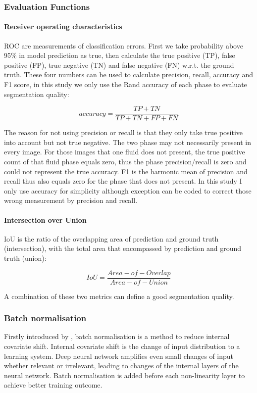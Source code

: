 \subsubsection{Evaluation Functions}
\paragraph{Receiver operating characteristics }
ROC \citep{delong1988comparing} are measurements of classification errors. First we take probability above 95\% in model prediction as true, then calculate the true positive (TP), false positive (FP), true negative (TN) and false negative (FN) w.r.t. the ground truth. These four numbers can be used to calculate precision, recall, accuracy and F1 score, in this study we only use the Rand accuracy of each phase to evaluate segmentation quality:

\begin{equation}
    accuracy=\frac{TP+TN}{TP+TN+FP+FN}
\end{equation}

The reason for not using precision or recall is that they only take true positive into account but not true negative. The two phase may not necessarily present in every image. For those images that one fluid does not present, the true positive count of that fluid phase equals zero, thus the phase precision/recall is zero and could not represent the true accuracy. F1 is the harmonic mean of precision and recall thus also equals zero for the phase that does not present. In this study I only use accuracy for simplicity although exception can be coded to correct those wrong measurement by precision and recall.

\paragraph{Intersection over Union}
IoU is the ratio of the overlapping area of prediction and ground truth (intersection), with the total area that encompassed by prediction and ground truth (union):

\begin{equation}
    IoU=\frac{Area-of-Overlap}{Area-of-Union}
\end{equation}

A combination of these two metrics can define a good segmentation quality.

\subsubsection{Batch normalisation}
Firstly introduced by \citet{ioffe2015batch}, batch normalisation is a method to reduce internal covariate shift. Internal covariate shift is the change of input distribution to a learning system. Deep neural network amplifies even small changes of input whether relevant or irrelevant, leading to changes of the internal layers of the neural network. Batch normalisation is added before each non-linearity layer to achieve better training outcome.

